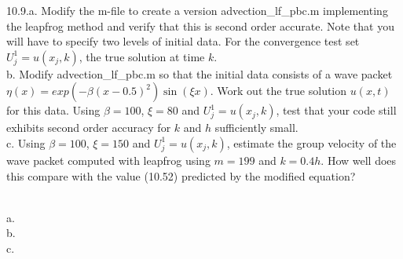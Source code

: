 10.9.a. Modify the m-file to create a version advection\_lf\_pbc.m implementing the leapfrog method and
verify that this is second order accurate. Note that you will have to specify two levels of initial
data. For the convergence test set $U^1_j=u(x_j,k)$, the true solution at time $k$.\\
b. Modify advection\_lf\_pbc.m so that the initial data consists of a wave packet
$\eta(x) =exp(-\beta(x-0.5)^2)\sin(\xi x)$. Work out the true solution $u(x, t)$ for this data. Using
$\beta =100$, $\xi=80$ and $U^1_j=u(x_j , k)$, test that your code still exhibits second order accuracy
for $k$ and $h$ sufficiently small.\\
c. Using $\beta= 100$, $\xi =150$ and $U^1_j=u(x_j , k)$, estimate the group velocity of the wave packet
computed with leapfrog using $m = 199$ and $k = 0.4h$. How well does this compare with the value (10.52)
predicted by the modified equation?\\

\begin{solution}\renewcommand{\qedsymbol}{}\ \\
    a. \\

    b. \\

    c.

\end{solution}